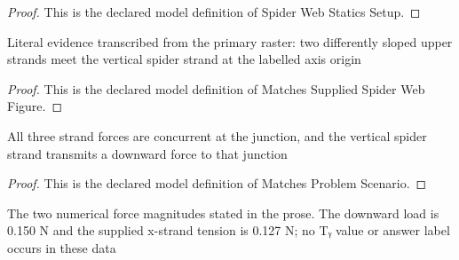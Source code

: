\begin{proof}
  This is the declared model definition of Spider Web Statics Setup.
\end{proof}
\begin{definition}
  \label{def:physics:phyx-mini-0681:phyxminiproblems-problemphyxmini0681-matchessuppliedspiderwebfigure}
  Literal evidence transcribed from the primary raster: two differently sloped upper strands meet the vertical spider strand at the labelled axis origin
\end{definition}
\begin{proof}
  This is the declared model definition of Matches Supplied Spider Web Figure.
\end{proof}
\begin{definition}
  \label{def:physics:phyx-mini-0681:phyxminiproblems-problemphyxmini0681-matchesproblemscenario}
  All three strand forces are concurrent at the junction, and the vertical spider strand transmits a downward force to that junction
\end{definition}
\begin{proof}
  This is the declared model definition of Matches Problem Scenario.
\end{proof}
\begin{definition}
  \label{def:physics:phyx-mini-0681:phyxminiproblems-problemphyxmini0681-matchesproblemforcereadouts}
  The two numerical force magnitudes stated in the prose. The downward load is 0.150 N and the supplied x-strand tension is 0.127 N; no Tᵧ value or answer label occurs in these data
\end{definition}
